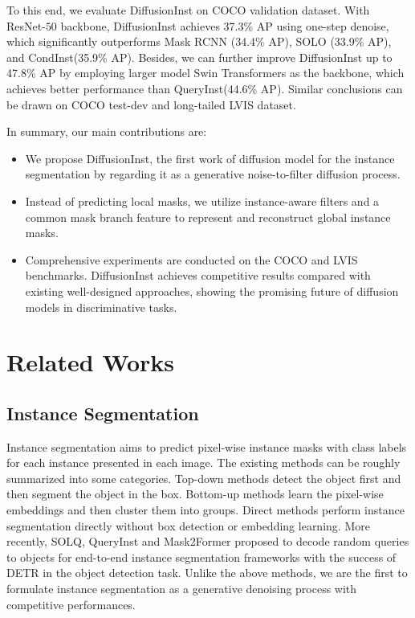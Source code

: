 \documentclass{article}
\begin{document}
To this end, we evaluate DiffusionInst on COCO\cite{COCO} validation dataset. With ResNet-$50$\cite{ResNet} backbone, DiffusionInst achieves 37.3\% AP using one-step denoise, which significantly outperforms Mask RCNN\cite{maskrcnn} (34.4\% AP), SOLO\cite{SOLO} (33.9\% AP), and CondInst\cite{CondInst}(35.9\% AP). Besides, we can further improve DiffusionInst up to 47.8\% AP by employing larger model Swin Transformers\cite{swin} as the backbone, which achieves better performance than QueryInst\cite{QueryInst}(44.6\% AP). Similar conclusions can be drawn on COCO test-dev and long-tailed LVIS\cite{LVIS} dataset.



In summary, our main contributions are: 
\begin{itemize}
\item We propose DiffusionInst, the first work of diffusion model for the instance segmentation by regarding it as a generative noise-to-filter diffusion process. 
    \item Instead of predicting local masks, we utilize instance-aware filters and a common mask branch feature to represent and reconstruct global instance masks.
    \item Comprehensive experiments are conducted on the COCO and LVIS benchmarks. DiffusionInst achieves competitive results compared with existing well-designed approaches, showing the promising future of diffusion models in discriminative tasks.
\end{itemize}









\section{Related Works}
\subsection{Instance Segmentation}
Instance segmentation aims to predict pixel-wise instance masks with class labels for each instance presented in each image. The existing methods can be roughly summarized into some categories. Top-down methods\cite{LiFCIASS,maskrcnn,PANet,BlendMask} detect the object first and then segment the object in the box. Bottom-up methods\cite{SGN,SSAP,AE} learn the pixel-wise embeddings and then cluster them into groups. Direct methods\cite{SOLO,SOLOv2} perform instance segmentation directly without box detection or embedding learning. More recently, SOLQ\cite{dong2021solq}, QueryInst\cite{QueryInst} and Mask2Former\cite{Mask2Former} proposed to decode random queries to objects for end-to-end instance segmentation frameworks with the success of DETR\cite{DETR} in the object detection task. Unlike the above methods, we are the first to formulate instance segmentation as a generative denoising process with competitive performances.
\end{document}

